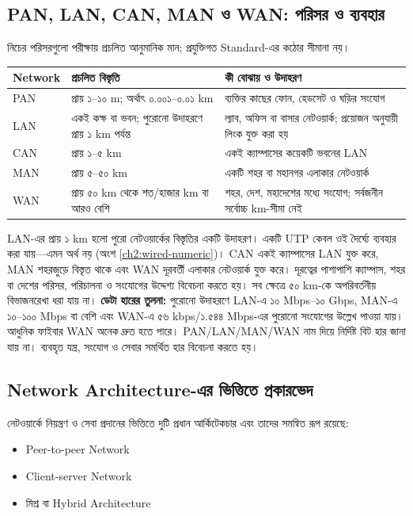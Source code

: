 \subsection{PAN, LAN, CAN, MAN ও WAN: পরিসর ও ব্যবহার}
\label{ch2:network-range}
নিচের পরিসরগুলো পরীক্ষায় প্রচলিত আনুমানিক মান; প্রযুক্তিগত Standard-এর কঠোর সীমানা নয়।
\begin{tabularx}{\linewidth}{|p{.12\linewidth}|p{.30\linewidth}|X|}\hline
\textbf{Network} & \textbf{প্রচলিত বিস্তৃতি} & \textbf{কী বোঝায় ও উদাহরণ}\\\hline
PAN & প্রায় ১--১০ m; অর্থাৎ ০.০০১--০.০১ km & ব্যক্তির কাছের ফোন, হেডসেট ও ঘড়ির সংযোগ\\\hline
LAN & একই কক্ষ বা ভবন; পুরোনো উদাহরণে প্রায় ১ km পর্যন্ত & ল্যাব, অফিস বা বাসার নেটওয়ার্ক; প্রয়োজন অনুযায়ী লিংক যুক্ত করা হয়\\\hline
CAN & প্রায় ১--৫ km & একই ক্যাম্পাসের কয়েকটি ভবনের LAN\\\hline
MAN & প্রায় ৫--৫০ km & একটি শহর বা মহানগর এলাকার নেটওয়ার্ক\\\hline
WAN & প্রায় ৫০ km থেকে শত/হাজার km বা আরও বেশি & শহর, দেশ, মহাদেশের মধ্যে সংযোগ; সর্বজনীন সর্বোচ্চ km-সীমা নেই\\\hline
\end{tabularx}
LAN-এর প্রায় ১ km হলো পুরো নেটওয়ার্কের বিস্তৃতির একটি উদাহরণ। একটি UTP কেবল ওই দৈর্ঘ্যে ব্যবহার করা যায়—এমন অর্থ নয় (অংশ \ref{ch2:wired-numeric})। CAN একই ক্যাম্পাসের LAN যুক্ত করে, MAN শহরজুড়ে বিস্তৃত থাকে এবং WAN দূরবর্তী এলাকার নেটওয়ার্ক যুক্ত করে। দূরত্বের পাশাপাশি ক্যাম্পাস, শহর বা দেশের পরিসর, পরিচালনা ও সংযোগের উদ্দেশ্য বিবেচনা করতে হয়। সব ক্ষেত্রে ৫০ km-কে অপরিবর্তনীয় বিভাজনরেখা ধরা যায় না।
\textbf{ডেটা হারের তুলনা:} পুরোনো উদাহরণে LAN-এ ১০ Mbps--১০ Gbps, MAN-এ ১০--১০০ Mbps বা বেশি এবং WAN-এ ৫৬ kbps/১.৫৪৪ Mbps-এর পুরোনো সংযোগের উল্লেখ পাওয়া যায়। আধুনিক ফাইবার WAN অনেক দ্রুত হতে পারে। PAN/LAN/MAN/WAN নাম দিয়ে নির্দিষ্ট বিট হার জানা যায় না। ব্যবহৃত যন্ত্র, সংযোগ ও সেবার সমর্থিত হার বিবেচনা করতে হয়।

\subsection{Network Architecture-এর ভিত্তিতে প্রকারভেদ}

নেটওয়ার্কে নিয়ন্ত্রণ ও সেবা প্রদানের ভিত্তিতে দুটি প্রধান আর্কিটেকচার এবং তাদের সমন্বিত রূপ রয়েছে:

\begin{itemize}
\item Peer-to-peer Network
\item Client-server Network
\item মিশ্র বা Hybrid Architecture
\end{itemize}

